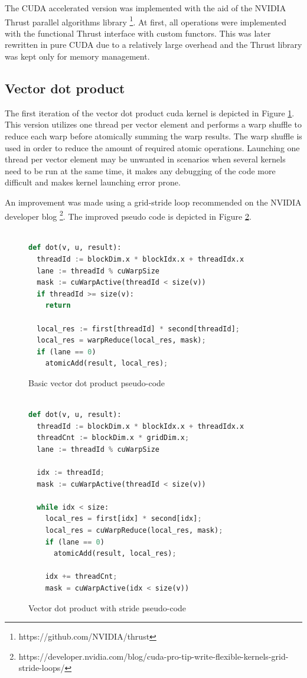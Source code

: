 \documentclass{article}
\begin{document}
The CUDA accelerated version was implemented with the aid of the
NVIDIA Thrust parallel algorithms library \footnote{https://github.com/NVIDIA/thrust}.
At first, all operations were implemented with the functional Thrust interface with custom
functors. This was later rewritten in pure CUDA due to a relatively large overhead
and the Thrust library was kept only for memory management.

\subsection{Vector dot product}
The first iteration of the vector dot product cuda kernel is depicted in Figure \ref{code:vdot_pseudo}.
This version utilizes one thread per vector element and performs a warp shuffle
to reduce each warp before atomically summing the warp results.
The warp shuffle is used in order to reduce the amount of required atomic operations.
Launching one thread per vector element may be unwanted in scenarios 
when several kernels need to be run at the same time,
it makes any debugging of the code more difficult and makes kernel launching error prone.

An improvement was made using a grid-stride loop recommended on the NVIDIA developer blog
\footnote{https://developer.nvidia.com/blog/cuda-pro-tip-write-flexible-kernels-grid-stride-loops/}.
The improved pseudo code is depicted in Figure \ref{code:vdot_pseudo_stride}.

\begin{figure}[H]
\begin{lstlisting}[language=Python,mathescape=true]

def dot(v, u, result):
  threadId := blockDim.x * blockIdx.x + threadIdx.x
  lane := threadId % cuWarpSize
  mask := cuWarpActive(threadId < size(v))
  if threadId >= size(v):
    return

  local_res := first[threadId] * second[threadId];
  local_res = warpReduce(local_res, mask);
  if (lane == 0)
    atomicAdd(result, local_res);

\end{lstlisting}
\caption{Basic vector dot product pseudo-code}
\label{code:vdot_pseudo}
\end{figure}

\begin{figure}[H]
\begin{lstlisting}[language=Python,mathescape=true]

def dot(v, u, result):
  threadId := blockDim.x * blockIdx.x + threadIdx.x
  threadCnt := blockDim.x * gridDim.x;
  lane := threadId % cuWarpSize

  idx := threadId;
  mask := cuWarpActive(threadId < size(v))

  while idx < size:
    local_res = first[idx] * second[idx];
    local_res = cuWarpReduce(local_res, mask);
    if (lane == 0)
      atomicAdd(result, local_res);

    idx += threadCnt;
    mask = cuWarpActive(idx < size(v))

\end{lstlisting}
\caption{Vector dot product with stride pseudo-code}
\label{code:vdot_pseudo_stride}
\end{figure}
\end{document}
